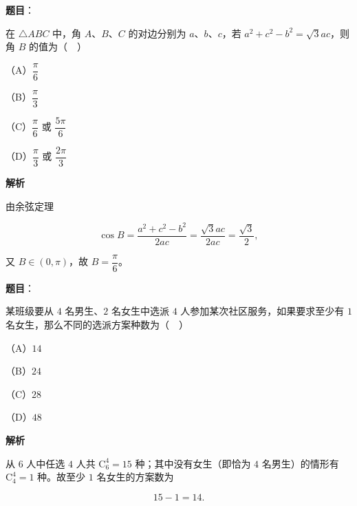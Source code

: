 \begin{answer}

\textbf{题目}：

在 $\triangle ABC$ 中，角 $A$、$B$、$C$ 的对边分别为 $a$、$b$、$c$，若 $a^2+c^2-b^2=\sqrt3ac$，则角 $B$ 的值为（　）

（A）$\dfrac{\pi}{6}$

（B）$\dfrac{\pi}{3}$

（C）$\dfrac{\pi}{6}$ 或 $\dfrac{5\pi}{6}$

（D）$\dfrac{\pi}{3}$ 或 $\dfrac{2\pi}{3}$

\textbf{解析}

由余弦定理

\nopagebreak[4]
\[\cos B=\frac{a^2+c^2-b^2}{2ac}=\frac{\sqrt3ac}{2ac}=\frac{\sqrt3}2,\]

又 $B\in(0,\pi)$，故 $B=\dfrac{\pi}6$。


\end{answer}
\begin{answer}

\textbf{题目}：

某班级要从 $4$ 名男生、$2$ 名女生中选派 $4$ 人参加某次社区服务，如果要求至少有 $1$ 名女生，那么不同的选派方案种数为（　）

（A）$14$

（B）$24$

（C）$28$

（D）$48$

\textbf{解析}

从 $6$ 人中任选 $4$ 人共 $\mathrm C_6^4=15$ 种；其中没有女生（即恰为 $4$ 名男生）的情形有 $\mathrm C_4^4=1$ 种。故至少 $1$ 名女生的方案数为

\nopagebreak[4]
\[15-1=14.\]


\end{answer}
